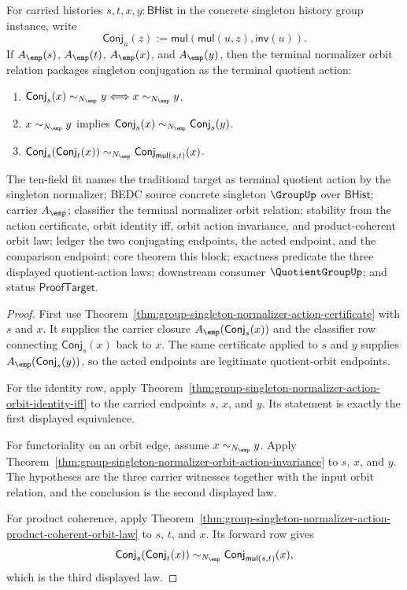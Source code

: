 \begin{theorem}
\label{thm:group-singleton-normalizer-quotient-action-terminal-package}
For carried histories $s,t,x,y:\mathsf{BHist}$ in the concrete singleton
history group instance, write
$$
\mathsf{Conj}_u(z):=\mathsf{mul}(\mathsf{mul}(u,z),\mathsf{inv}(u)).
$$
If $A_{\emp}(s)$, $A_{\emp}(t)$, $A_{\emp}(x)$, and $A_{\emp}(y)$, then the
terminal normalizer orbit relation packages singleton conjugation as the
terminal quotient action:
\begin{enumerate}
\item
$\mathsf{Conj}_s(x)\sim_{N_{\emp}}y \Longleftrightarrow
x\sim_{N_{\emp}}y$.
\item
$x\sim_{N_{\emp}}y$ implies
$\mathsf{Conj}_s(x)\sim_{N_{\emp}}\mathsf{Conj}_s(y)$.
\item
$\mathsf{Conj}_s(\mathsf{Conj}_t(x))\sim_{N_{\emp}}
\mathsf{Conj}_{\mathsf{mul}(s,t)}(x)$.
\end{enumerate}
The ten-field fit names the traditional target as terminal quotient action by
the singleton normalizer; BEDC source concrete singleton $\GroupUp$ over
$\mathsf{BHist}$; carrier $A_{\emp}$; classifier the terminal normalizer orbit
relation; stability from the action certificate, orbit identity iff, orbit
action invariance, and product-coherent orbit law; ledger the two conjugating
endpoints, the acted endpoint, and the comparison endpoint; core theorem this
block; exactness predicate the three displayed quotient-action laws; downstream
consumer $\QuotientGroupUp$; and status $\mathsf{ProofTarget}$.
\end{theorem}
\begin{proof}
First use Theorem~\ref{thm:group-singleton-normalizer-action-certificate} with
$s$ and $x$. It supplies the carrier closure
$A_{\emp}(\mathsf{Conj}_s(x))$ and the classifier row connecting
$\mathsf{Conj}_s(x)$ back to $x$. The same certificate applied to $s$ and $y$
supplies $A_{\emp}(\mathsf{Conj}_s(y))$, so the acted endpoints are legitimate
quotient-orbit endpoints.

For the identity row, apply
Theorem~\ref{thm:group-singleton-normalizer-action-orbit-identity-iff} to the
carried endpoints $s$, $x$, and $y$. Its statement is exactly the first
displayed equivalence.

For functoriality on an orbit edge, assume $x\sim_{N_{\emp}}y$. Apply
Theorem~\ref{thm:group-singleton-normalizer-orbit-action-invariance} to $s$,
$x$, and $y$. The hypotheses are the three carrier witnesses together with the
input orbit relation, and the conclusion is the second displayed law.

For product coherence, apply
Theorem~\ref{thm:group-singleton-normalizer-action-product-coherent-orbit-law}
to $s$, $t$, and $x$. Its forward row gives
$$
\mathsf{Conj}_s(\mathsf{Conj}_t(x))\sim_{N_{\emp}}
\mathsf{Conj}_{\mathsf{mul}(s,t)}(x),
$$
which is the third displayed law.
\end{proof}
